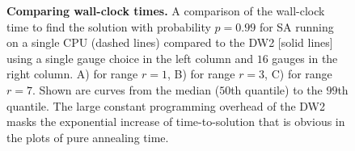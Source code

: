 \begin{figure}
{}
\caption{{\bf Comparing wall-clock times.} A comparison of the wall-clock time to find the solution with probability $p=0.99$ for SA running on a single CPU (dashed lines) compared to the DW2 [solid lines] using a single gauge choice in the left column and $16$ gauges in the right column. A) for range $r=1$, B) for range $r=3$, C) for range $r=7$. Shown are curves from the median ($50$th quantile) to the $99$th quantile. The large constant programming overhead of the DW2 masks the exponential increase of time-to-solution that is obvious in the plots of pure annealing time.}
\label{fig:wall-clock}
\end{figure}


